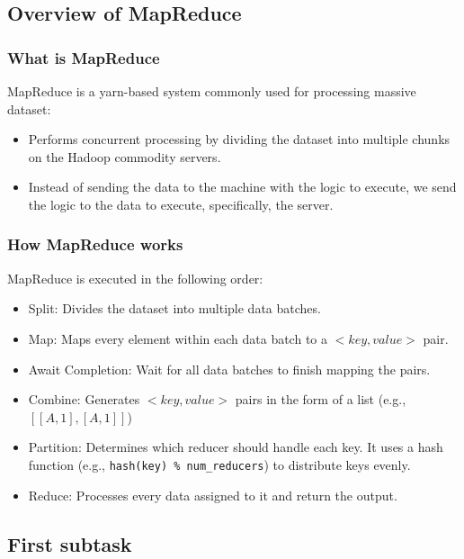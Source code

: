 \subsection{Overview of MapReduce}
\label{subsec:overview-of-mapreduce}

\subsubsection{What is MapReduce}

MapReduce is a yarn-based system commonly used for processing massive dataset:

\begin{itemize}
    \item Performs concurrent processing by dividing the dataset into multiple chunks on the Hadoop commodity servers.
    \item Instead of sending the data to the machine with the logic to execute, we send the logic to the data to execute, specifically, the server.
\end{itemize}

\subsubsection{How MapReduce works}

MapReduce is executed in the following order:

\begin{itemize}
    \item Split: Divides the dataset into multiple data batches.
    \item Map: Maps every element within each data batch to a $<key,value>$ pair.
    \item Await Completion: Wait for all data batches to finish mapping the pairs.
    \item Combine: Generates $<key,value>$ pairs in the form of a list (e.g., $[[A,1],[A,1]]$)
    \item Partition: Determines which reducer should handle each key.
    It uses a hash function (e.g., \texttt{hash(key) \% num\_reducers}) to distribute keys evenly.
    \item Reduce: Processes every data assigned to it and return the output.
\end{itemize}

\subsection{First subtask}
\label{subsec:first-subtask}

